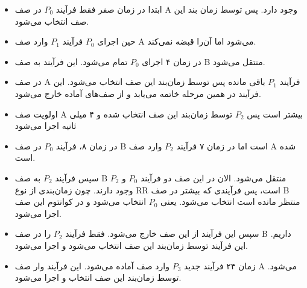 \documentclass[]{article}
\begin{document}
\begin{itemize}
    \item ابتدا در زمان صفر فقط فرآیند $P_0$ در صف A وجود دارد. پس توسط زمان بند این صف انتخاب می‌شود.
    \item حین اجرای $P_0$ فرآیند $P_1$ وارد صف A می‌شود اما آن‌را قبضه نمی‌کند.
    \item در زمان ۴ اجرای $P_0$ تمام می‌شود. این فرآیند به صف B منتقل می‌شود.
    \item در صف A فرآیند $P_1$ باقی مانده پس توسط زمان‌بند این صف انتخاب می‌شود. این فرآیند در همین مرحله خاتمه می‌یابد و از صف‌های آماده خارج می‌شود.
    \item اولویت صف A بیشتر است پس $P_2$ توسط زمان‌بند این صف انتخاب شده و ۴ میلی ثانیه اجرا می‌شود
    \item در زمان ۸، فرآیند $P_0$ در صف B است اما در زمان ۷ فرآیند $P_2$ وارد صف A شده است.
    \item سپس فرآیند $P_2$ به صف B منتقل می‌شود.
          الان در این صف دو فرآیند $P_0$ و $P_2$ وجود دارند.
          چون زمان‌بندی از نوع RR است، پس فرآیندی که بیشتر در صف B منتظر مانده است انتخاب می‌شود.
          یعنی $P_0$ انتخاب می‌شود و در کوانتوم این صف اجرا می‌شود.
    \item سپس این فرآیند از این صف خارج می‌شود. فقط فرآیند $P_2$ را در صف B داریم.
          این فرآیند توسط زمان‌بند این صف انتخاب می‌شود و اجرا می‌شود.
    \item زمان ۲۴ فرآیند جدید $P_3$ وارد صف آماده می‌شود. این فرآیند وار صف A می‌شود.
          توسط زمان‌بند این صف انتخاب و اجرا می‌شود.
\end{itemize}
\end{document}
